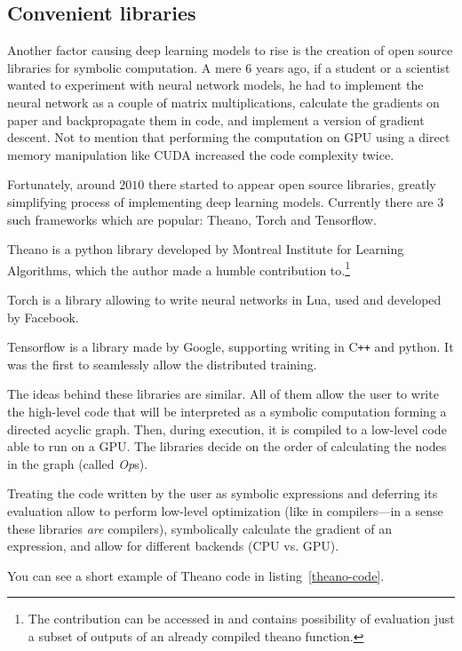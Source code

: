 \subsection{Convenient libraries}
Another factor causing deep learning models to rise is the creation of open source libraries for symbolic computation. A mere $6$ years ago, if a student or a scientist wanted to experiment with neural network models, he had to implement the neural network as a couple of matrix multiplications, calculate the gradients on paper and backpropagate them in code, and implement a version of gradient descent. Not to mention that performing the computation on GPU using a direct memory manipulation like CUDA increased the code complexity twice.

Fortunately, around $2010$ there started to appear open source libraries, greatly simplifying process of implementing deep learning models. Currently there are $3$ such frameworks which are popular: Theano, Torch and Tensorflow.

Theano \cite{theano} is a python library developed by Montreal Institute for Learning Algorithms, which the author made a humble contribution to.\footnote{The contribution can be accessed in \cite{theano-contrib} and contains possibility of evaluation just a subset of outputs of an already compiled theano function.}

Torch \cite{torch} is a library allowing to write neural networks in Lua, used and developed by Facebook.

Tensorflow \cite{tensorflow} is a library made by Google, supporting writing in C\texttt{++} and python. It was the first to seamlessly allow the distributed training.

The ideas behind these libraries are similar. All of them allow the user to write the high-level code that will be interpreted as a symbolic computation forming a directed acyclic graph. Then, during execution, it is compiled to a low-level code able to run on a GPU. The libraries decide on the order of calculating the nodes in the graph (called \emph{Op}s).

Treating the code written by the user as symbolic expressions and deferring its evaluation allow to perform low-level optimization (like in compilers---in a sense these libraries \textit{are} compilers), symbolically calculate the gradient of an expression, and allow for different backends (CPU vs. GPU).

You can see a short example of Theano code in listing~\ref{theano-code}.

